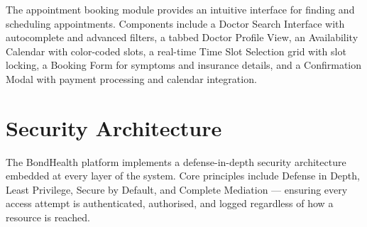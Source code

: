 \justifying
The appointment booking module provides an intuitive interface for finding and scheduling
appointments. Components include a Doctor Search Interface with autocomplete and advanced
filters, a tabbed Doctor Profile View, an Availability Calendar with color-coded slots,
a real-time Time Slot Selection grid with slot locking, a Booking Form for symptoms and
insurance details, and a Confirmation Modal with payment processing and calendar integration.

\section{Security Architecture}

\justifying
The BondHealth platform implements a defense-in-depth security architecture embedded at every
layer of the system. Core principles include Defense in Depth, Least Privilege, Secure by
Default, and Complete Mediation — ensuring every access attempt is authenticated, authorised,
and logged regardless of how a resource is reached.

